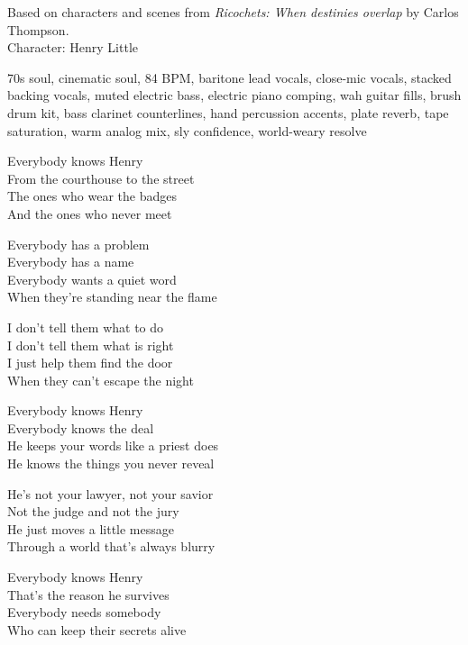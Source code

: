 
\begin{notes}
Based on characters and scenes from \emph{Ricochets: When destinies overlap} by Carlos Thompson.\\
Character: Henry Little
\end{notes}
\begin{style}
70s soul, cinematic soul, 84 BPM, baritone lead vocals, close-mic vocals, stacked backing vocals, muted electric bass, electric piano comping, wah guitar fills, brush drum kit, bass clarinet counterlines, hand percussion accents, plate reverb, tape saturation, warm analog mix, sly confidence, world-weary resolve
\end{style}
\begin{lyrics}

Everybody knows Henry\\
From the courthouse to the street\\
The ones who wear the badges\\
And the ones who never meet

Everybody has a problem\\
Everybody has a name\\
Everybody wants a quiet word\\
When they’re standing near the flame

I don’t tell them what to do\\
I don’t tell them what is right\\
I just help them find the door\\
When they can’t escape the night

Everybody knows Henry\\
Everybody knows the deal\\
He keeps your words like a priest does\\
He knows the things you never reveal

He’s not your lawyer, not your savior\\
Not the judge and not the jury\\
He just moves a little message\\
Through a world that’s always blurry

Everybody knows Henry\\
That’s the reason he survives\\
Everybody needs somebody\\
Who can keep their secrets alive


\end{lyrics}
